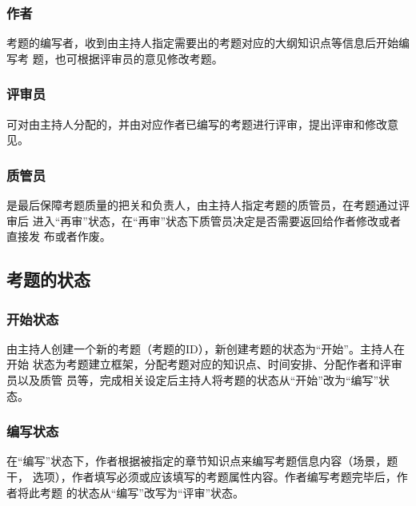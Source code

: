 \documentclass[hyperref, a4paper]{ctexart}
\begin{document}
\hypertarget{ux4f5cux8005}{%
\subsubsection{作者}\label{ux4f5cux8005}}

考题的编写者，收到由主持人指定需要出的考题对应的大纲知识点等信息后开始编写考
题，也可根据评审员的意见修改考题。

\hypertarget{ux8bc4ux5ba1ux5458}{%
\subsubsection{评审员}\label{ux8bc4ux5ba1ux5458}}

可对由主持人分配的，并由对应作者已编写的考题进行评审，提出评审和修改意见。

\hypertarget{ux8d28ux7ba1ux5458}{%
\subsubsection{质管员}\label{ux8d28ux7ba1ux5458}}

是最后保障考题质量的把关和负责人，由主持人指定考题的质管员，在考题通过评审后
进入``再审''状态，在``再审''状态下质管员决定是否需要返回给作者修改或者直接发
布或者作废。

\hypertarget{ux8003ux9898ux7684ux72b6ux6001}{%
\subsection{考题的状态}\label{ux8003ux9898ux7684ux72b6ux6001}}

\hypertarget{ux5f00ux59cbux72b6ux6001}{%
\subsubsection{开始状态}\label{ux5f00ux59cbux72b6ux6001}}

由主持人创建一个新的考题（考题的ID），新创建考题的状态为``开始''。主持人在开始
状态为考题建立框架，分配考题对应的知识点、时间安排、分配作者和评审员以及质管
员等，完成相关设定后主持人将考题的状态从``开始''改为``编写''状态。

\hypertarget{ux7f16ux5199ux72b6ux6001}{%
\subsubsection{编写状态}\label{ux7f16ux5199ux72b6ux6001}}

在``编写''状态下，作者根据被指定的章节知识点来编写考题信息内容（场景，题干，
选项），作者填写必须或应该填写的考题属性内容。作者编写考题完毕后，作者将此考题
的状态从``编写''改写为``评审''状态。
\end{document}
